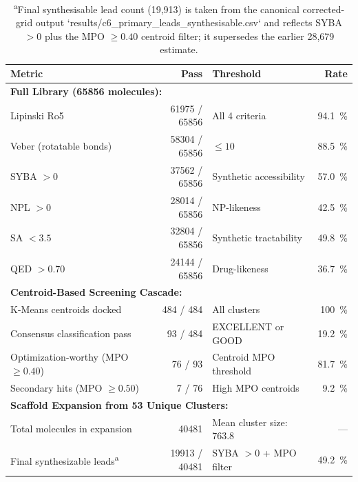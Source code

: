 \documentclass[journal=jcisd8,manuscript=suppinfo]{achemso}
\begin{document}
\begin{table}[htbp]
\centering
\caption{Aggregate drug-likeness compliance rates across the full \num{65856}-molecule hybrid library and the \num{40481}-molecule scaffold expansion from \num{53} unique optimization-worthy clusters. Tracks Lipinski, Veber, and synthetic accessibility (SYBA) thresholds essential for experimental developability. \textit{Stringent multi-parameter filtering yields a high-quality lead population with over \qty{94}{\percent} Lipinski compliance and favorable synthetic accessibility.}}
\label{tab:druglikeness}
\begin{tabular}{@{}l r l r@{}}
\toprule
\textbf{Metric} & \textbf{Pass} & \textbf{Threshold} & \textbf{Rate} \\
\midrule
\multicolumn{4}{l}{\textbf{Full Library (\num{65856} molecules):}} \\
Lipinski Ro5 & \num{61975} / \num{65856} & All \num{4} criteria & \qty{94.1}{\percent} \\
Veber (rotatable bonds) & \num{58304} / \num{65856} & $\leq \num{10}$ & \qty{88.5}{\percent} \\
SYBA $> \num{0}$ & \num{37562} / \num{65856} & Synthetic accessibility & \qty{57.0}{\percent} \\
NPL $> \num{0}$ & \num{28014} / \num{65856} & NP-likeness & \qty{42.5}{\percent} \\
SA $< \num{3.5}$ & \num{32804} / \num{65856} & Synthetic tractability & \qty{49.8}{\percent} \\
QED $> \num{0.70}$ & \num{24144} / \num{65856} & Drug-likeness & \qty{36.7}{\percent} \\
\midrule
\multicolumn{4}{l}{\textbf{Centroid-Based Screening Cascade:}} \\
K-Means centroids docked & \num{484} / \num{484} & All clusters & \qty{100}{\percent} \\
Consensus classification pass & \num{93} / \num{484} & EXCELLENT or GOOD & \qty{19.2}{\percent} \\
Optimization-worthy (MPO $\geq \num{0.40}$) & \num{76} / \num{93} & Centroid MPO threshold & \qty{81.7}{\percent} \\
Secondary hits (MPO $\geq \num{0.50}$) & \num{7} / \num{76} & High MPO centroids & \qty{9.2}{\percent} \\
\midrule
\multicolumn{4}{l}{\textbf{Scaffold Expansion from \num{53} Unique Clusters:}} \\
Total molecules in expansion & \num{40481} & Mean cluster size: \num{763.8} & --- \\
Final synthesizable leads\textsuperscript{a} & \num{19913} / \num{40481} & SYBA $> 0$ + MPO filter & \qty{49.2}{\percent} \\
\bottomrule
\end{tabular}
\caption*{\textsuperscript{a}Final synthesisable lead count (19,913) is taken from the canonical corrected-grid output `results/c6\_primary\_leads\_synthesisable.csv` and reflects SYBA $>0$ plus the MPO $\geq0.40$ centroid filter; it supersedes the earlier 28,679 estimate.}
\end{table}
\end{document}
